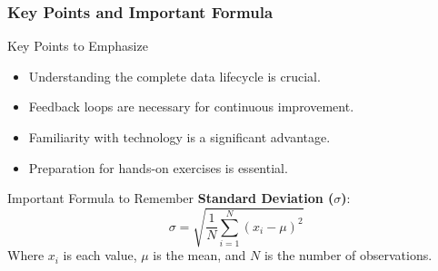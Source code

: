 \documentclass[aspectratio=169]{beamer}
\begin{document}
\begin{frame}[fragile]
    \frametitle{Key Points and Important Formula}
    \begin{block}{Key Points to Emphasize}
        \begin{itemize}
            \item Understanding the complete data lifecycle is crucial.
            \item Feedback loops are necessary for continuous improvement.
            \item Familiarity with technology is a significant advantage.
            \item Preparation for hands-on exercises is essential.
        \end{itemize}
    \end{block}

    \begin{block}{Important Formula to Remember}
        \textbf{Standard Deviation ($\sigma$)}:
        \begin{equation}
        \sigma = \sqrt{\frac{1}{N}\sum_{i=1}^{N}(x_i - \mu)^2}
        \end{equation}
        Where \(x_i\) is each value, \(\mu\) is the mean, and \(N\) is the number of observations.
    \end{block}
\end{frame}
\end{document}
